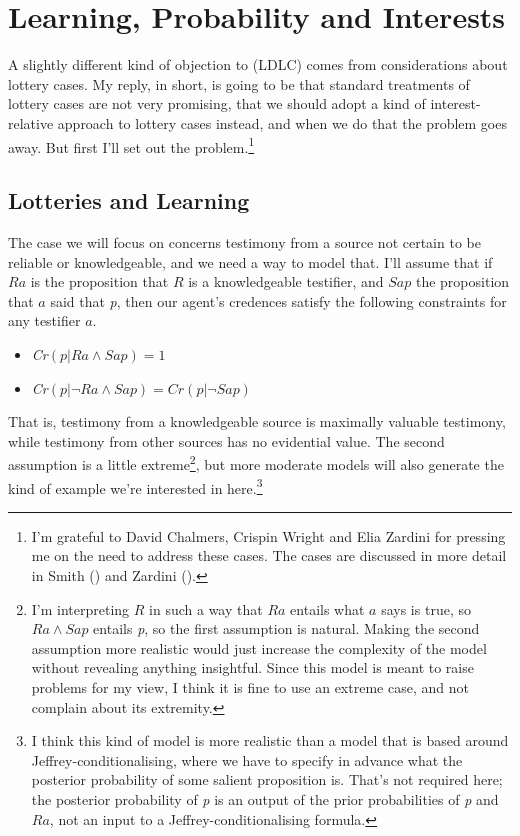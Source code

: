 \documentclass[
  10pt,
  letterpaper,
  DIV=11,
  numbers=noendperiod,
  twoside]{scrartcl}
\begin{document}
\section{Learning, Probability and
Interests}\label{learning-probability-and-interests}

A slightly different kind of objection to (LDLC) comes from
considerations about lottery cases. My reply, in short, is going to be
that standard treatments of lottery cases are not very promising, that
we should adopt a kind of interest-relative approach to lottery cases
instead, and when we do that the problem goes away. But first I'll set
out the problem.\footnote{I'm grateful to David Chalmers, Crispin Wright
  and Elia Zardini for pressing me on the need to address these cases.
  The cases are discussed in more detail in Smith
  () and Zardini
  ().}

\subsection{Lotteries and Learning}\label{lotteries-and-learning}

The case we will focus on concerns testimony from a source not certain
to be reliable or knowledgeable, and we need a way to model that. I'll
assume that if \(Ra\) is the proposition that \(R\) is a knowledgeable
testifier, and \(Sap\) the proposition that \(a\) said that \emph{p},
then our agent's credences satisfy the following constraints for any
testifier \(a\).

\begin{itemize}
\item
  \emph{Cr}\((p | Ra \wedge Sap) = 1\)
\item
  \emph{Cr}\((p | \neg Ra \wedge Sap) = \textit{Cr}(p | \neg Sap)\)
\end{itemize}

That is, testimony from a knowledgeable source is maximally valuable
testimony, while testimony from other sources has no evidential value.
The second assumption is a little extreme\footnote{I'm interpreting
  \(R\) in such a way that \(Ra\) entails what \(a\) says is true, so
  \(Ra \wedge Sap\) entails \emph{p}, so the first assumption is
  natural. Making the second assumption more realistic would just
  increase the complexity of the model without revealing anything
  insightful. Since this model is meant to raise problems for my view, I
  think it is fine to use an extreme case, and not complain about its
  extremity.}, but more moderate models will also generate the kind of
example we're interested in here.\footnote{I think this kind of model is
  more realistic than a model that is based around
  Jeffrey-conditionalising, where we have to specify in advance what the
  posterior probability of some salient proposition is. That's not
  required here; the posterior probability of \emph{p} is an output of
  the prior probabilities of \emph{p} and \(Ra\), not an input to a
  Jeffrey-conditionalising formula.}
\end{document}
